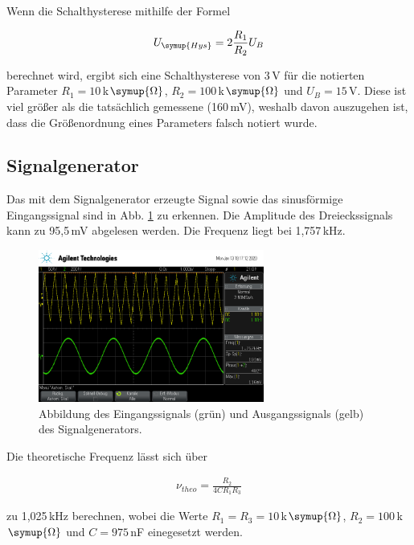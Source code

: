             Wenn die Schalthysterese mithilfe der Formel

            \begin{align*}
                U_{\symup{{Hys}}} = 2\frac{R_1}{R_2}U_B
            \end{align*}

            berechnet wird, ergibt sich eine Schalthysterese von 3\,V für die 
            notierten Parameter $R_1=10\,$k$\symup{\Omega}$, $R_2=100\,$k$\symup{\Omega}$ und $U_B=15$\,V.
            Diese ist viel größer als die tatsächlich gemessene (160\,mV), weshalb davon auszugehen ist,
            dass die Größenordnung eines Parameters falsch notiert wurde.


        \subsection{Signalgenerator}

            Das mit dem Signalgenerator erzeugte Signal sowie das sinusförmige Eingangssignal 
            sind in Abb. \ref{fig:schmittint} zu erkennen. Die Amplitude des Dreieckssignals 
            kann zu 95,5\,mV abgelesen werden. Die Frequenz liegt bei 1,757\,kHz.

            \begin{figure}[H]
                \centering 
                \includegraphics[height=5cm]{scope_11.png}
                \caption{Abbildung des Eingangssignals (grün) und Ausgangssignals (gelb) des Signalgenerators.}
                \label{fig:schmittint}
            \end{figure}

            Die theoretische Frequenz lässt sich über 

            \begin{align*}
                \nu_{theo} = \frac{R_2}{4CR_1R_3} 
            \end{align*}

            zu 1,025\,kHz berechnen, wobei die Werte $R_1=R_3=10$\,k$\symup{\Omega}$, $R_2=100$\,k$\symup{\Omega}$
            und $C=975$\,nF einegesetzt werden.


